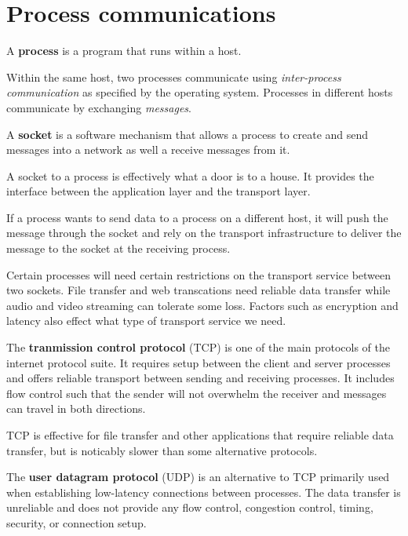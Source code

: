 \section{Process communications}

\begin{definition}[Process]
    A \textbf{process} is a program that runs within a host.
\end{definition}

Within the same host, two processes communicate using \emph{inter-process communication} as specified by the operating system. Processes in different hosts communicate by exchanging \emph{messages}.

\begin{definition}[Socket]
    A \textbf{socket} is a software mechanism that allows a process to create and send messages into a network as well a receive messages from it.
\end{definition}

A socket to a process is effectively what a door is to a house. It provides the interface between the application layer and the transport layer.

If a process wants to send data to a process on a different host, it will push the message through the socket and rely on the transport infrastructure to deliver the message to the socket at the receiving process.

Certain processes will need certain restrictions on the transport service between two sockets. File transfer and web transcations need reliable data transfer while audio and video streaming can tolerate some loss. Factors such as encryption and latency also effect what type of transport service we need.

\begin{definition}
    The \textbf{tranmission control protocol} (TCP) is one of the main protocols of the internet protocol suite. It requires setup between the client and server processes and offers reliable transport between sending and receiving processes. It includes flow control such that the sender will not overwhelm the receiver and messages can travel in both directions.
\end{definition}

TCP is effective for file transfer and other applications that require reliable data transfer, but is noticably slower than some alternative protocols.

\begin{definition}
    The \textbf{user datagram protocol} (UDP) is an alternative to TCP primarily used when establishing low-latency connections between processes. The data transfer is unreliable and does not provide any flow control, congestion control, timing, security, or connection setup.
\end{definition}

